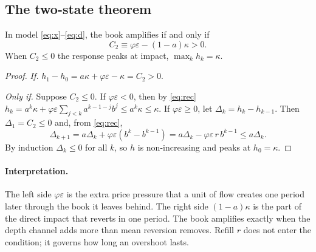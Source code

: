 \subsection{The two-state theorem}

\begin{theorem}\label{thm:t6}
In model \eqref{eq:x}--\eqref{eq:d}, the book amplifies if and only if
\[
C_2\equiv\varphi\varepsilon-(1-a)\kappa>0 .
\]
When $C_2\le0$ the response peaks at impact, $\max_kh_k=\kappa$.
\end{theorem}

\begin{proof}
\emph{If.} $h_1-h_0=a\kappa+\varphi\varepsilon-\kappa=C_2>0$.

\emph{Only if.} Suppose $C_2\le0$. If $\varphi\varepsilon<0$, then by \eqref{eq:rec} $h_k=a^k\kappa+\varphi\varepsilon\sum_{j<k}a^{k-1-j}b^j\le a^k\kappa\le\kappa$. If $\varphi\varepsilon\ge0$, let $\Delta_k=h_k-h_{k-1}$. Then $\Delta_1=C_2\le0$ and, from \eqref{eq:rec},
\[
\Delta_{k+1}=a\Delta_k+\varphi\varepsilon(b^{k}-b^{k-1})=a\Delta_k-\varphi\varepsilon\,r\,b^{k-1}\le a\Delta_k .
\]
By induction $\Delta_k\le0$ for all $k$, so $h$ is non-increasing and peaks at $h_0=\kappa$.
\end{proof}

\paragraph{Interpretation.} The left side $\varphi\varepsilon$ is the extra price pressure that a unit of flow creates one period later through the book it leaves behind. The right side $(1-a)\kappa$ is the part of the direct impact that reverts in one period. The book amplifies exactly when the depth channel adds more than mean reversion removes. Refill $r$ does not enter the condition; it governs how long an overshoot lasts.

